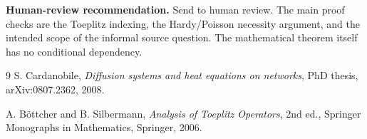 \documentclass[11pt]{article}
\theoremstyle{definition}
\begin{document}
\medskip
\noindent\textbf{Human-review recommendation.}
Send to human review.  The main proof checks are the Toeplitz indexing, the
Hardy/Poisson necessity argument, and the intended scope of the informal
source question.  The mathematical theorem itself has no conditional
dependency.

\begin{thebibliography}{9}
S. Cardanobile,
\emph{Diffusion systems and heat equations on networks},
PhD thesis, arXiv:0807.2362, 2008.

A. B\"ottcher and B. Silbermann,
\emph{Analysis of Toeplitz Operators},
2nd ed., Springer Monographs in Mathematics, Springer, 2006.
\end{thebibliography}
\end{document}
